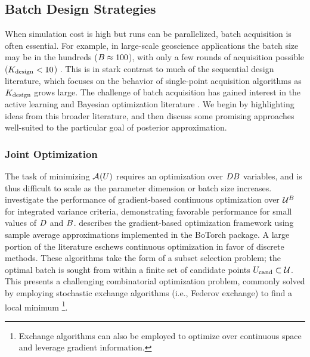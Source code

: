 \documentclass[12pt]{article}
\begin{document}
\subsection{Batch Design Strategies}
When simulation cost is high but runs can be parallelized, batch acquisition is often essential. For example, in large-scale
geoscience applications the batch size may be in the hundreds ($\Nbatch \approx 100$), with only a few rounds 
of acquisition possible ($\Nrounds < 10$) \citep{FerEmulation}. This is in stark contrast to much of the sequential 
design literature, which focuses on the behavior of single-point acquisition algorithms as $\Nrounds$ grows large.
The challenge of batch acquisition has gained interest in the active learning and Bayesian 
optimization literature \citep{Ginsbourger2010,LOEPPKY20101452,Chevalier2013,batchBOThesis}. We begin 
by highlighting ideas from this broader literature, and then discuss some promising approaches
well-suited to the particular goal of posterior approximation.

\subsubsection{Joint Optimization}
The task of minimizing $\acq[](\parMat)$ requires an optimization over $\dimPar\Nbatch$ variables, and is thus
difficult to scale as the parameter dimension or batch size increases. \citet{Mercer_kernels_IVAR} investigate
the performance of gradient-based continuous optimization over $\parSpace^\Nbatch$ for integrated variance
criteria, demonstrating favorable performance for small values of $\dimPar$ and $\Nbatch$. 
\citep{botorch} describes the gradient-based optimization framework using sample average approximations
implemented in the BoTorch package. A large portion of the literature eschews continuous optimization in 
favor of discrete methods. These algorithms take the form of a subset selection problem; the optimal batch
is sought from within a finite set of candidate points $\parMatCand \subset \parSpace$. This presents a 
challenging combinatorial optimization problem, commonly solved by employing stochastic exchange 
algorithms (i.e., Federov exchange) to find a local minimum \citep{FederovExchange,WynnDiscreteExchange,LOEPPKY20101452}
\footnote{Exchange algorithms can also be employed to optimize over continuous space and leverage gradient information.}.
\end{document}
